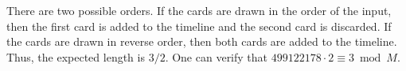 \nextsample

There are two possible orders.
If the cards are drawn in the order of the input, then the first card is added to the timeline and the second card is discarded.
If the cards are drawn in reverse order, then both cards are added to the timeline.
Thus, the expected length is $3/2$.
One can verify that $499122178 \cdot 2 \equiv 3 \bmod M$.